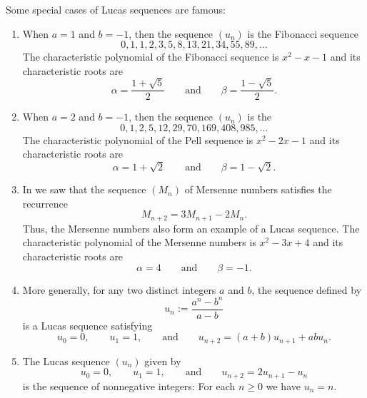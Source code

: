 \begin{example}
  Some special cases of Lucas sequences are famous:
  \begin{enumerate}
  \item When $a=1$ and $b=-1$, then the sequence $(u_n)$ is the Fibonacci sequence
    \begin{equation*}
      0,1,1,2,3,5,8,13,21,34,55,89,\ldots
    \end{equation*}
    The characteristic polynomial of the Fibonacci sequence is $x^2-x-1$ and its characteristic roots are
    \begin{equation*}
      \alpha=\frac{1+\sqrt{5}}{2}\qquad\text{and}\qquad \beta=\frac{1-\sqrt{5}}{2}.
    \end{equation*}
  \item When $a=2$ and $b=-1$, then the sequence $(u_n)$ is the 
    \begin{equation*}
      0,1,2,5,12,29,70,169,408,985,\ldots
    \end{equation*}
    The characteristic polynomial of the Pell sequence is $x^2-2x-1$ and its characteristic roots are
    \begin{equation*}
      \alpha=1+\sqrt{2}\qquad\text{and}\qquad \beta=1-\sqrt{2}.
    \end{equation*}
  \item In  we saw that the sequence $(M_n)$ of Mersenne numbers satisfies the recurrence
    \begin{equation*}
      M_{n+2}=3M_{n+1}-2M_n.
    \end{equation*}
    Thus, the Mersenne numbers also form an example of a Lucas sequence. The characteristic polynomial of the Mersenne numbers is $x^2-3x+4$ and its characteristic roots are
    \begin{equation*}
      \alpha=4 \qquad\text{and}\qquad \beta=-1.
    \end{equation*}
  \item More generally, for any two distinct integers $a$ and $b$, the sequence defined by
    \begin{equation*}
      u_n := \frac{a^n-b^n}{a-b}
    \end{equation*}
    is a Lucas sequence satisfying
    \begin{equation*}
      u_0=0,\qquad u_1=1,\qquad\text{and}\qquad u_{n+2}=(a+b)u_{n+1}+abu_n. 
    \end{equation*}
  \item The Lucas sequence $(u_n)$ given by
    \begin{equation*}
      u_0=0,\qquad u_1=1,\qquad\text{and}\qquad u_{n+2}=2u_{n+1}-u_n
    \end{equation*}
    is the sequence of nonnegative integers: For each $n\geq 0$ we have $u_n=n$.
  \end{enumerate}
\end{example}

